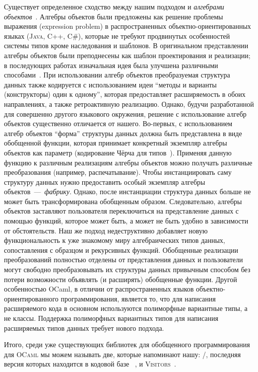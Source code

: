 Существует определенное сходство между нашим подходом и \emph{алгебрами объектов}~\cite{ObjectAlgebras}. Алгебры объектов были предложены как решение проблемы выражения (expression problem) в распространенных объектно-ориентированных языках  (\textsc{Java}, \textsc{C++}, \textsc{C\#}), которые не требуют продвинутых особенностей системы типов кроме наследования и шаблонов. В оригинальном представлении алгебры объектов были преподнесены как шаблон проектирования и реализации; в последующих работах изначальная идея была улучшена различными способами~\cite{ObjectAlgebrasAttribute,ObjectAlgebrasSYB}. При использовании алгебр объектов преобразуемая структура данных также кодируется с использованием идеи ``методы и варианты (конструкторы) один к одному'', которая предоставляет расширяемость в обоих направлениях, а также ретроактивную реализацию. Однако, будучи  разработанной для совершенно другого языкового окружения, решение с использование алгебр объектов существенно отличается от нашего. Во-первых, с использованием алгебр объектов ``форма'' структуры данных должна быть представлена в виде обобщенной функции, которая принимает конкретный экземпляр алгебры объектов как параметр (кодирование Чёрча для типов~\cite{Hinze}). Применяя данную функцию к различным реализациям алгебры объектов можно получать различные преобразования (например, распечатывание). Чтобы инстанциировать саму структуру данных нужно предоставить особый экземпляр алгебры объектов~---~\emph{фабрику}. Однако, после инстанциации структура данных больше не может быть трансформирована обобщенным образом. Следовательно, алгебры объектов заставляют пользователя переключиться на представление данных с помощью функций, которое может быть, а может не быть удобно в зависимости от обстоятельств.  Наш же подход недеструктивно добавляет новую функциональность к уже знакомому миру алгебраических типов данных, сопоставления с образцом и рекурсивных функций. Обобщенные реализации преобразований полностью отделены от представления данных и пользователи могут свободно преобразовывать их структуры данных привычным способом  без потери возможности объявлять (и расширять) обобщенные функции. Другой особенностью OCaml, в отличии от распространенных языков объектно-ориентированного программирования, является то, что для написания расширяемого кода в основном используются полиморфные вариантные типы, а не классы. Поддержка полиморфных вариантных типов для написания расширяемых типов данных требует нового подхода.


Итого, среди уже существующих библиотек для обобщенного программирования для \textsc{OCaml} мы можем называть две, которые напоминают нашу: /, последняя версия которых находится в кодовой базе ~\cite{PPXLib}, и \textsc{Visitors}~\cite{Visitors}.

